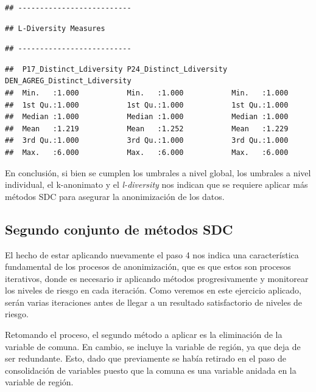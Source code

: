 \documentclass[]{book}
\theoremstyle{definition}
\theoremstyle{definition}
\theoremstyle{definition}
\theoremstyle{definition}
\theoremstyle{remark}
\begin{document}
\begin{verbatim}
## --------------------------
\end{verbatim}

\begin{verbatim}
## L-Diversity Measures
\end{verbatim}

\begin{verbatim}
## --------------------------
\end{verbatim}

\begin{verbatim}
##  P17_Distinct_Ldiversity P24_Distinct_Ldiversity DEN_AGREG_Distinct_Ldiversity
##  Min.   :1.000           Min.   :1.000           Min.   :1.000                
##  1st Qu.:1.000           1st Qu.:1.000           1st Qu.:1.000                
##  Median :1.000           Median :1.000           Median :1.000                
##  Mean   :1.219           Mean   :1.252           Mean   :1.229                
##  3rd Qu.:1.000           3rd Qu.:1.000           3rd Qu.:1.000                
##  Max.   :6.000           Max.   :6.000           Max.   :6.000
\end{verbatim}

En conclusión, si bien se cumplen los umbrales a nivel global, los umbrales a nivel individual, el k-anonimato y el \emph{l-diversity} nos indican que se requiere aplicar más métodos SDC para asegurar la anonimización de los datos.

\hypertarget{segundo-conjunto-de-muxe9todos-sdc}{%
\subsection{Segundo conjunto de métodos SDC}\label{segundo-conjunto-de-muxe9todos-sdc}}

El hecho de estar aplicando nuevamente el paso 4 nos indica una característica fundamental de los procesos de anonimización, que es que estos son procesos iterativos, donde es necesario ir aplicando métodos progresivamente y monitorear los niveles de riesgo en cada iteración. Como veremos en este ejercicio aplicado, serán varias iteraciones antes de llegar a un resultado satisfactorio de niveles de riesgo.

Retomando el proceso, el segundo método a aplicar es la eliminación de la variable de comuna. En cambio, se incluye la variable de región, ya que deja de ser redundante. Esto, dado que previamente se había retirado en el paso de consolidación de variables puesto que la comuna es una variable anidada en la variable de región.
\end{document}
